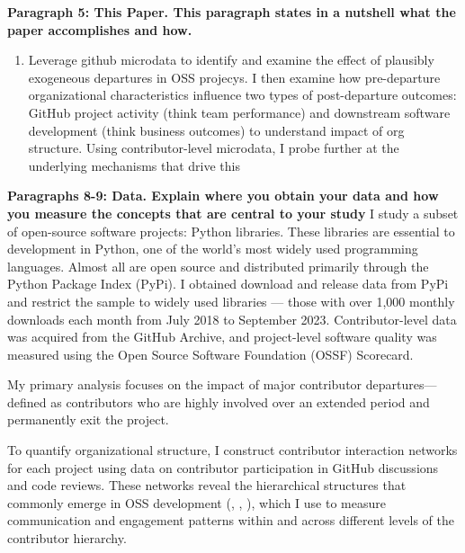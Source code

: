 \documentclass[12pt,notitlepage]{article}
\begin{document}
\textbf{Paragraph 5: This Paper. This paragraph states in a nutshell what the paper accomplishes and how. }

\begin{enumerate}
    \item Leverage github microdata to identify and examine the effect of plausibly exogeneous departures in OSS projecys. I then examine how pre-departure organizational characteristics influence two types of post-departure outcomes: GitHub project activity (think team performance) and downstream software development (think business outcomes) to understand impact of org structure. Using contributor-level microdata, I probe further at the underlying mechanisms that drive this

\end{enumerate}



\textbf{Paragraphs 8-9: Data. Explain where you obtain your data and how you measure the concepts that
are central to your study}
I study a subset of open-source software projects: Python libraries. These libraries are essential to development in Python, one of the world’s most widely used programming languages. Almost all are open source and distributed primarily through the Python Package Index (PyPi). I obtained download and release data from PyPi and restrict the sample to widely used libraries — those with over 1,000 monthly downloads each month from July 2018 to September 2023. Contributor-level data was acquired from the GitHub Archive, and project-level software quality was measured using the Open Source Software Foundation (OSSF) Scorecard. 

My primary analysis focuses on the impact of major contributor departures—defined as contributors who are highly involved over an extended period and permanently exit the project. 

To quantify organizational structure, I construct contributor interaction networks for each project using data on contributor participation in GitHub discussions and code reviews. These networks reveal the hierarchical structures that commonly emerge in OSS development (\cite{crowston_coordination_2005}, \cite{crowston_core_2006}, \cite{crowston_hierarchy_2006}), which I use to measure communication and engagement patterns within and across different levels of the contributor hierarchy.
\end{document}
